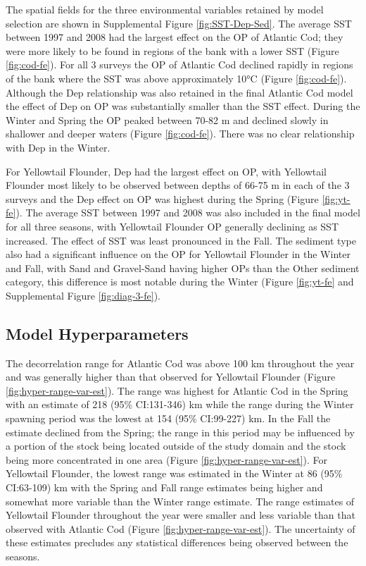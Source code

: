 \documentclass[
]{article}
\begin{document}
The spatial fields for the three environmental variables retained by model selection are shown in Supplemental Figure \ref{fig:SST-Dep-Sed}. The average SST between 1997 and 2008 had the largest effect on the OP of Atlantic Cod; they were more likely to be found in regions of the bank with a lower SST (Figure \ref{fig:cod-fe}). For all 3 surveys the OP of Atlantic Cod declined rapidly in regions of the bank where the SST was above approximately 10°C (Figure \ref{fig:cod-fe}). Although the Dep relationship was also retained in the final Atlantic Cod model the effect of Dep on OP was substantially smaller than the SST effect. During the Winter and Spring the OP peaked between 70-82 m and declined slowly in shallower and deeper waters (Figure \ref{fig:cod-fe}). There was no clear relationship with Dep in the Winter.

For Yellowtail Flounder, Dep had the largest effect on OP, with Yellowtail Flounder most likely to be observed between depths of 66-75 m in each of the 3 surveys and the Dep effect on OP was highest during the Spring (Figure \ref{fig:yt-fe}). The average SST between 1997 and 2008 was also included in the final model for all three seasons, with Yellowtail Flounder OP generally declining as SST increased. The effect of SST was least pronounced in the Fall. The sediment type also had a significant influence on the OP for Yellowtail Flounder in the Winter and Fall, with Sand and Gravel-Sand having higher OPs than the Other sediment category, this difference is most notable during the Winter (Figure \ref{fig:yt-fe} and Supplemental Figure \ref{fig:diag-3-fe}).

\hypertarget{model-hyperparameters}{%
\subsection{Model Hyperparameters}\label{model-hyperparameters}}

The decorrelation range for Atlantic Cod was above 100 km throughout the year and was generally higher than that observed for Yellowtail Flounder (Figure \ref{fig:hyper-range-var-est}). The range was highest for Atlantic Cod in the Spring with an estimate of 218 (95\% CI:131-346) km while the range during the Winter spawning period was the lowest at 154 (95\% CI:99-227) km. In the Fall the estimate declined from the Spring; the range in this period may be influenced by a portion of the stock being located outside of the study domain and the stock being more concentrated in one area (Figure \ref{fig:hyper-range-var-est}). For Yellowtail Flounder, the lowest range was estimated in the Winter at 86 (95\% CI:63-109) km with the Spring and Fall range estimates being higher and somewhat more variable than the Winter range estimate. The range estimates of Yellowtail Flounder throughout the year were smaller and less variable than that observed with Atlantic Cod (Figure \ref{fig:hyper-range-var-est}). The uncertainty of these estimates precludes any statistical differences being observed between the seasons.
\end{document}
